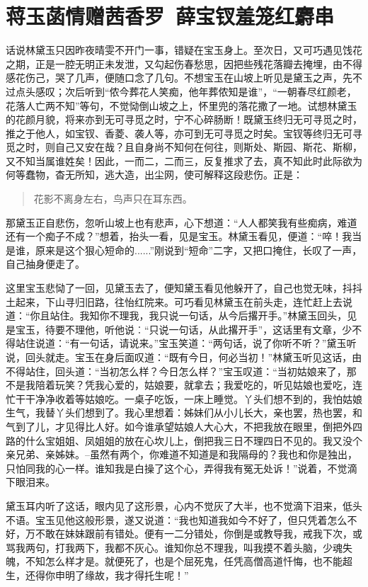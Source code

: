 \documentclass[12pt,oneside]{book}
\newenvironment{shici}{%
\begin{verse}%
\centering\large\hspace{12pt}}%
{\end{verse}}
\begin{document}
\chapter{蒋玉菡情赠茜香罗~薛宝钗羞笼红麝串}
话说林黛玉只因昨夜晴雯不开门一事，错疑在宝玉身上。至次日，又可巧遇见饯花之期，正是一腔无明正未发泄，又勾起伤春愁思，因把些残花落瓣去掩埋，由不得感花伤己，哭了几声，便随口念了几句。不想宝玉在山坡上听见是黛玉之声，先不过点头感叹；次后听到“侬今葬花人笑痴，他年葬侬知是谁”，“一朝春尽红颜老，花落人亡两不知”等句，不觉恸倒山坡之上，怀里兜的落花撒了一地。试想林黛玉的花颜月貌，将来亦到无可寻觅之时，宁不心碎肠断！既黛玉终归无可寻觅之时，推之于他人，如宝钗、香菱、袭人等，亦可到无可寻觅之时矣。宝钗等终归无可寻觅之时，则自己又安在哉？且自身尚不知何在何往，则斯处、斯园、斯花、斯柳，又不知当属谁姓矣！因此，一而二，二而三，反复推求了去，真不知此时此际欲为何等蠢物，杳无所知，逃大造，出尘网，使可解释这段悲伤。正是：

\begin{shici}
花影不离身左右，鸟声只在耳东西。
\end{shici}


那黛玉正自悲伤，忽听山坡上也有悲声，心下想道：“人人都笑我有些痴病，难道还有一个痴子不成？”想着，抬头一看，见是宝玉。林黛玉看见，便道：“啐！我当是谁，原来是这个狠心短命的......”刚说到“短命”二字，又把口掩住，长叹了一声，自己抽身便走了。

这里宝玉悲恸了一回，见黛玉去了，便知黛玉看见他躲开了，自己也觉无味，抖抖土起来，下山寻归旧路，往怡红院来。可巧看见林黛玉在前头走，连忙赶上去说道：“你且站住。我知你不理我，我只说一句话，从今后撂开手。”林黛玉回头，见是宝玉，待要不理他，听他说︰“只说一句话，从此撂开手”，这话里有文章，少不得站住说道：“有一句话，请说来。”宝玉笑道：“两句话，说了你听不听？”黛玉听说，回头就走。宝玉在身后面叹道：“既有今日，何必当初！”林黛玉听见这话，由不得站住，回头道：“当初怎么样？今日怎么样？”宝玉叹道：“当初姑娘来了，那不是我陪着玩笑？凭我心爱的，姑娘要，就拿去；我爱吃的，听见姑娘也爱吃，连忙干干净净收着等姑娘吃。一桌子吃饭，一床上睡觉。丫头们想不到的，我怕姑娘生气，我替丫头们想到了。我心里想着：姊妹们从小儿长大，亲也罢，热也罢，和气到了儿，才见得比人好。如今谁承望姑娘人大心大，不把我放在眼里，倒把外四路的什么宝姐姐、凤姐姐的放在心坎儿上，倒把我三日不理四日不见的。我又没个亲兄弟、亲姊妹。--虽然有两个，你难道不知道是和我隔母的？我也和你是独出，只怕同我的心一样。谁知我是白操了这个心，弄得我有冤无处诉！”说着，不觉滴下眼泪来。

黛玉耳内听了这话，眼内见了这形景，心内不觉灰了大半，也不觉滴下泪来，低头不语。宝玉见他这般形景，遂又说道：“我也知道我如今不好了，但只凭着怎么不好，万不敢在妹妹跟前有错处。便有一二分错处，你倒是或教导我，戒我下次，或骂我两句，打我两下，我都不灰心。谁知你总不理我，叫我摸不着头脑，少魂失魄，不知怎么样才是。就便死了，也是个屈死鬼，任凭高僧高道忏悔，也不能超生，还得你申明了缘故，我才得托生呢！”
\end{document}
